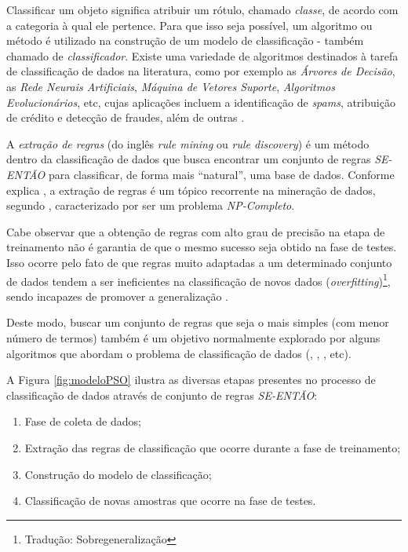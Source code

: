 \documentclass[
	12pt,				%
	openany,			%
	oneside,	
	a4paper,			%
	brazil,				%
	]{unimontes-ppgmsc-abntex2}
\begin{document}
Classificar um objeto significa atribuir um rótulo, chamado {\em classe}, de acordo com a categoria à qual ele pertence. Para que isso seja possível, um algoritmo ou método é utilizado na construção de um modelo de classificação - também chamado de {\em classificador}. Existe uma variedade de algoritmos destinados à tarefa de classificação de dados na literatura, como por exemplo as {\em Árvores de Decisão}, as {\em Rede Neurais Artificiais}, {\em Máquina de Vetores Suporte}, {\em Algoritmos Evolucionários}, etc, cujas aplicações incluem a identificação de {\em spams}, atribuição de crédito e detecção de fraudes, além de outras \cite{Castro_2016}.

A {\em extração de regras} (do inglês {\em rule mining} ou {\em rule discovery}) é um método dentro da classificação de dados que busca encontrar um conjunto de regras {\em SE-ENTÃO} para classificar, de forma mais ``natural'',  uma base de dados. Conforme explica , a extração de regras é um tópico recorrente na mineração de dados, segundo , caracterizado por ser um problema {\em NP-Completo}.

Cabe observar que a obtenção de regras com alto grau de precisão na etapa de treinamento não é garantia de que o mesmo sucesso seja obtido na fase de testes. Isso ocorre pelo fato de que regras muito adaptadas a um determinado conjunto de dados tendem a ser ineficientes na classificação de novos dados ({\em overfitting})\footnote{Tradução: Sobregeneralização}, sendo incapazes de promover a generalização \cite{Pereira_2010}. 

Deste modo, buscar um conjunto de regras que seja o mais simples (com menor número de termos) também é um objetivo normalmente explorado por alguns algoritmos que abordam o problema de classificação de dados (, , , etc).

A Figura \ref{fig:modeloPSO} ilustra as diversas etapas presentes no processo de classificação de dados através de conjunto de regras {\em SE-ENTÃO}: 

\begin{enumerate}[label={(\roman*)}]
\item Fase de coleta de dados;
\item Extração das regras de classificação que ocorre durante a fase de treinamento;
\item Construção do modelo de classificação;
\item Classificação de novas amostras que ocorre na fase de testes.
\end{enumerate}
\end{document}
